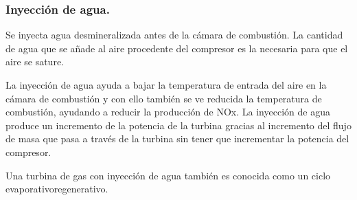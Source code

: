 			\subsubsection{Inyección de agua.}
				Se inyecta agua desmineralizada antes de la cámara de combustión. La cantidad de agua que se añade al aire procedente del compresor es la necesaria para que el aire se sature. 
				
				
				La inyección de agua ayuda a bajar la temperatura de entrada del aire en la cámara de combustión y con ello también se ve reducida la temperatura de combustión, ayudando a reducir la producción de NOx. La inyección de agua produce un incremento de la potencia de la turbina gracias al incremento del flujo de masa que pasa a través de la turbina sin tener que incrementar la potencia del compresor.
				
				
				Una turbina de gas con inyección de agua también es conocida como un ciclo evaporativoregenerativo.
				
